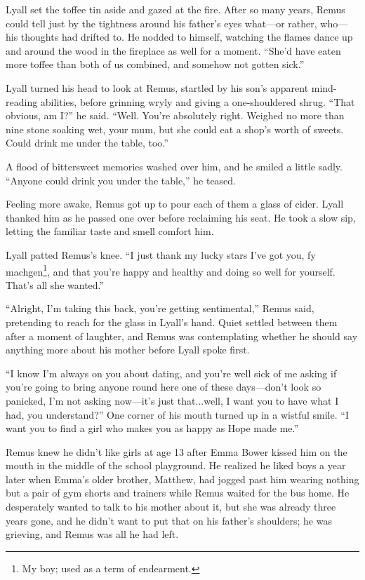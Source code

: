 Lyall set the toffee tin aside and gazed at the fire. After so many years, Remus could tell just by the tightness around his father’s eyes what—or rather, who—his thoughts had drifted to. He nodded to himself, watching the flames dance up and around the wood in the fireplace as well for a moment. “She’d have eaten more toffee than both of us combined, and somehow not gotten sick.”

Lyall turned his head to look at Remus, startled by his son’s apparent mind-reading abilities, before grinning wryly and giving a one-shouldered shrug. “That obvious, am I?” he said. “Well. You’re absolutely right. Weighed no more than nine stone soaking wet, your mum, but she could eat a shop’s worth of sweets. Could drink me under the table, too.”

A flood of bittersweet memories washed over him, and he smiled a little sadly. “Anyone could drink you under the table,” he teased.

Feeling more awake, Remus got up to pour each of them a glass of cider. Lyall thanked him as he passed one over before reclaiming his seat. He took a slow sip, letting the familiar taste and smell comfort him.

Lyall patted Remus’s knee. “I just thank my lucky stars I’ve got you, fy machgen\footnote{My boy; used as a term of endearment.}, and that you’re happy and healthy and doing so well for yourself. That’s all she wanted.”

“Alright, I’m taking this back, you’re getting sentimental,” Remus said, pretending to reach for the glass in Lyall’s hand. Quiet settled between them after a moment of laughter, and Remus was contemplating whether he should say anything more about his mother before Lyall spoke first.

“I know I’m always on you about dating, and you’re well sick of me asking if you’re going to bring anyone round here one of these days—don’t look so panicked, I’m not asking now—it’s just that...well, I want you to have what I had, you understand?” One corner of his mouth turned up in a wistful smile. “I want you to find a girl who makes you as happy as Hope made me.”

Remus knew he didn’t like girls at age 13 after Emma Bower kissed him on the mouth in the middle of the school playground. He realized he liked boys a year later when Emma’s older brother, Matthew, had jogged past him wearing nothing but a pair of gym shorts and trainers while Remus waited for the bus home. He desperately wanted to talk to his mother about it, but she was already three years gone, and he didn’t want to put that on his father’s shoulders; he was grieving, and Remus was all he had left.

